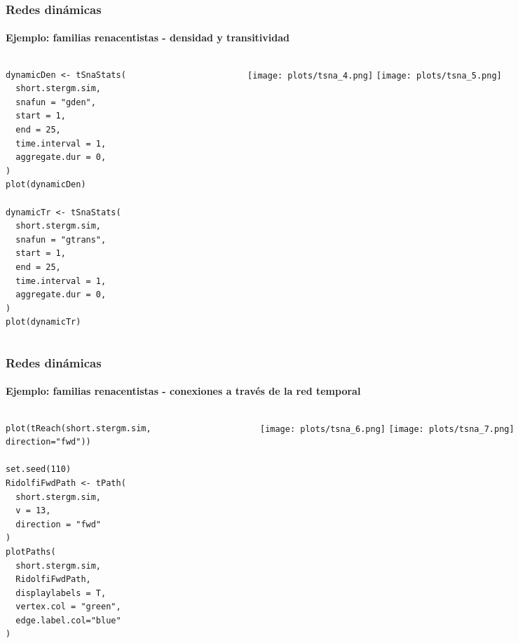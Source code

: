 \documentclass[11pt]{beamer}
\begin{document}
\begin{frame}[fragile]
\frametitle{Redes dinámicas}
\framesubtitle{Ejemplo: familias renacentistas - densidad y transitividad}
\begin{columns}
\begin{column}{0.4\linewidth}
\begin{verbatim} 
dynamicDen <- tSnaStats(
  short.stergm.sim,
  snafun = "gden",
  start = 1,
  end = 25,
  time.interval = 1,
  aggregate.dur = 0, 
)
plot(dynamicDen)

dynamicTr <- tSnaStats(
  short.stergm.sim,
  snafun = "gtrans",
  start = 1,
  end = 25,
  time.interval = 1,
  aggregate.dur = 0, 
)
plot(dynamicTr)

    \end{verbatim}
    \end{column}
 
\begin{column}{0.4\linewidth}
    \begin{figure}
    \centering
\texttt{[image: plots/tsna\_4.png]}
\texttt{[image: plots/tsna\_5.png]}

    \label{fig:my_label}
\end{figure}    
\end{column}
\end{columns}
\end{frame}

\begin{frame}[fragile]
\frametitle{Redes dinámicas}
\framesubtitle{Ejemplo: familias renacentistas - conexiones a través de la red temporal}
\begin{columns}
\begin{column}{0.4\linewidth}
\begin{verbatim} 
plot(tReach(short.stergm.sim,
direction="fwd"))

set.seed(110)
RidolfiFwdPath <- tPath(
  short.stergm.sim,
  v = 13,
  direction = "fwd"
)
plotPaths(
  short.stergm.sim,
  RidolfiFwdPath,
  displaylabels = T,
  vertex.col = "green",
  edge.label.col="blue"
)

    \end{verbatim}
    \end{column}
 
\begin{column}{0.4\linewidth}
    \begin{figure}
    \centering
\texttt{[image: plots/tsna\_6.png]}
\texttt{[image: plots/tsna\_7.png]}

    \label{fig:my_label}
\end{figure}    
\end{column}
\end{columns}
\end{frame}
\end{document}
